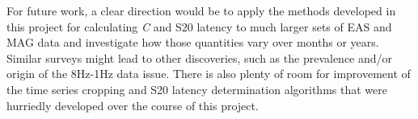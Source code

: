 For future work, a clear direction would be to apply the methods developed in this project for calculating \textit{C} and S20 latency to much larger sets of EAS and MAG data and investigate how those quantities vary over months or years. Similar surveys might lead to other discoveries, such as the prevalence and/or origin of the 8Hz-1Hz data issue. There is also plenty of room for improvement of the time series cropping and S20 latency determination algorithms that were hurriedly developed over the course of this project.
